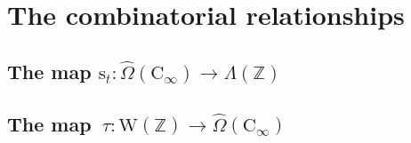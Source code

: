 \section{The combinatorial relationships}

\subsection{The map $\mathrm{s}_t\colon\hat{\Omega}(\mathrm{C}_\infty)\to\Lambda(\mathbb{Z})$}


\subsection{The map~$\tau\colon\mathrm{W}(\mathbb{Z})\to\hat{\Omega}(\mathrm{C}_\infty)$}
